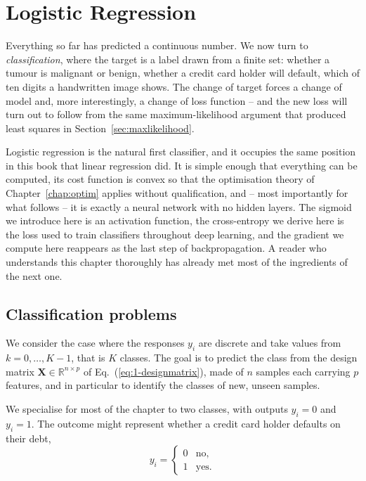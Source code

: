 \chapter{Logistic Regression}
\label{chap:logreg}

Everything so far has predicted a continuous number.  We now turn to
\emph{classification}, where the target is a label drawn from a finite set:
whether a tumour is malignant or benign, whether a credit card holder will
default, which of ten digits a handwritten image shows.  The change of target
forces a change of model and, more interestingly, a change of loss function --
and the new loss will turn out to follow from the same maximum-likelihood
argument that produced least squares in Section~\ref{sec:maxlikelihood}.

Logistic regression is the natural first classifier, and it occupies the same
position in this book that linear regression did.  It is simple enough that
everything can be computed, its cost function is convex so that the
optimisation theory of Chapter~\ref{chap:optim} applies without qualification,
and -- most importantly for what follows -- it is exactly a neural network with
no hidden layers.  The sigmoid we introduce here is an activation function,
the cross-entropy we derive here is the loss used to train classifiers
throughout deep learning, and the gradient we compute here reappears as the
last step of backpropagation.  A reader who understands this chapter
thoroughly has already met most of the ingredients of the next one.

\section{Classification problems}
\label{sec:classification}

We consider the case where the responses $y_i$ are discrete and take values
from $k=0,\dots,K-1$, that is $K$ classes.  The goal is to predict the class
from the design matrix $\bm{X}\in\mathbb{R}^{n\times p}$ of
Eq.~(\ref{eq:1-designmatrix}), made of $n$ samples each carrying $p$ features,
and in particular to identify the classes of new, unseen samples.

We specialise for most of the chapter to two classes, with outputs $y_i=0$ and
$y_i=1$.  The outcome might represent whether a credit card holder defaults on
their debt,
\begin{equation}
  y_i = \begin{cases} 0 & \text{no},\\ 1 & \text{yes}. \end{cases}
  \label{eq:5-binarylabels}
\end{equation}

